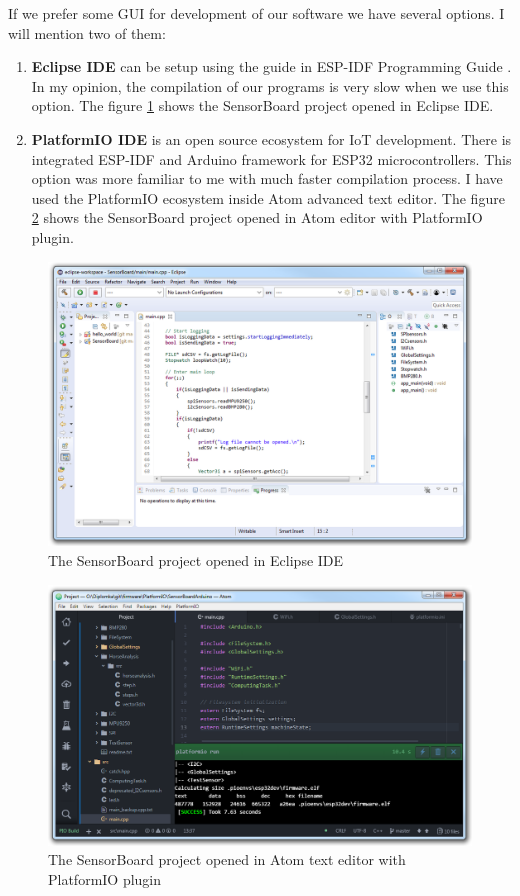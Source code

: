 If we prefer some GUI for development of our software we have several options. I will mention two of them:
\begin{enumerate}
    \item \textbf{Eclipse IDE} can be setup using the guide in \ac{ESP-IDF} Programming Guide \cite{ESP32eclipse}. In my opinion, the compilation of our programs is very slow when we use this option. The figure \ref{ESP32eclipse} shows the SensorBoard project opened in Eclipse IDE.
    \item \textbf{PlatformIO IDE} is an open source ecosystem for \ac{IoT} development. \cite{PlatformIO} There is integrated \ac{ESP-IDF} and Arduino framework for ESP32 microcontrollers. This option was more familiar to me with much faster compilation process. I have used the PlatformIO ecosystem inside Atom \cite{AtomEditor} advanced text editor. The figure \ref{ESP32atom} shows the SensorBoard project opened in Atom editor with PlatformIO plugin.
\end{enumerate}

\begin{figure}
    \centering
    \label{ESP32eclipse}
    \caption{The SensorBoard project opened in Eclipse IDE}
    \includegraphics[width=\linewidth]{img/ESP32eclipse.png}
\end{figure}

\begin{figure}
    \centering
    \label{ESP32atom}
    \caption{The SensorBoard project opened in Atom text editor with PlatformIO plugin}
    \includegraphics[width=\linewidth]{img/ESP32atom.png}
\end{figure}

